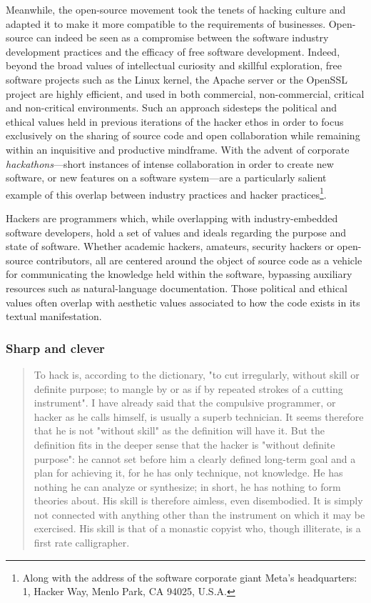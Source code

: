 Meanwhile, the open-source movement took the tenets of hacking culture and adapted it to make it more compatible to the requirements of businesses. Open-source can indeed be seen as a compromise between the software industry development practices and the efficacy of free software development. Indeed, beyond the broad values of intellectual curiosity and skillful exploration, free software projects such as the Linux kernel, the Apache server or the OpenSSL project are highly efficient, and used in both commercial, non-commercial, critical and non-critical environments\cite{raymond_cathedral_2001}. Such an approach sidesteps the political and ethical values held in previous iterations of the hacker ethos in order to focus exclusively on the sharing of source code and open collaboration while remaining within an inquisitive and productive mindframe. With the advent of corporate \emph{hackathons}—short instances of intense collaboration in order to create new software, or new features on a software system—are a particularly salient example of this overlap between industry practices and hacker practices\cite{nolte_you_2018}\footnote{Along with the address of the software corporate giant Meta's headquarters: 1, Hacker Way, Menlo Park, CA 94025, U.S.A.}.

\vspace*{1\baselineskip}

Hackers are programmers which, while overlapping with industry-embedded software developers, hold a set of values and ideals regarding the purpose and state of software. Whether academic hackers, amateurs, security hackers or open-source contributors, all are centered around the object of source code as a vehicle for communicating the knowledge held within the software, bypassing auxiliary resources such as natural-language documentation. Those political and ethical values often overlap with aesthetic values associated to how the code exists in its textual manifestation.

\subsubsection{Sharp and clever}

\begin{quote}
  To hack is, according to the dictionary, "to cut irregularly, without skill or definite purpose; to mangle by or as if by repeated strokes of a cutting instrument". I have already said that the compulsive programmer, or hacker as he calls himself, is usually a superb technician. It seems therefore that he is not "without skill" as the definition will have it. But the definition fits in the deeper sense that the hacker is "without definite purpose": he cannot set before him a clearly defined long-term goal and a plan for achieving it, for he has only technique, not knowledge. He has nothing he can analyze or synthesize; in short, he has nothing to form theories about. His skill is therefore aimless, even disembodied. It is simply not connected with anything other than the instrument on which it may be exercised. His skill is that of a monastic copyist who, though illiterate, is a first rate calligrapher.\cite{weizenbaum_computer_1976}
\end{quote}

